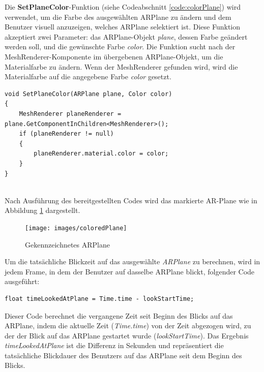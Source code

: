 Die \textbf{SetPlaneColor}-Funktion (siehe Codeabschnitt \ref{code:colorPlane}) wird verwendet, um die Farbe des ausgewählten
ARPlane zu ändern und dem Benutzer visuell anzuzeigen, welches ARPlane selektiert ist. Diese Funktion akzeptiert zwei
Parameter: das ARPlane-Objekt \textit{plane}, dessen Farbe geändert werden soll, und die gewünschte Farbe \textit{color}.
Die Funktion sucht nach der MeshRenderer-Komponente im übergebenen ARPlane-Objekt, um die Materialfarbe zu ändern. Wenn
der MeshRenderer gefunden wird, wird die Materialfarbe auf die angegebene Farbe \textit{color} gesetzt.
\begin{lstlisting}[style=csharp, caption={Ausgewaehltes ARPlane kennzeichnen}, label=code:colorPlane]
void SetPlaneColor(ARPlane plane, Color color)
{
    MeshRenderer planeRenderer = plane.GetComponentInChildren<MeshRenderer>();
    if (planeRenderer != null)
    {
        planeRenderer.material.color = color;
    }
}
\end{lstlisting}\\

Nach Ausführung des bereitgestellten Codes wird das markierte AR-Plane wie in Abbildung \ref{fig:colPlane} dargestellt.
\begin{figure}[h]
    \centering
    \texttt{[image: images/coloredPlane]}
    \caption{Gekennzeichnetes ARPlane}
    \label{fig:colPlane}
\end{figure}

Um die tatsächliche Blickzeit auf das ausgewählte \textit{ARPlane} zu berechnen, wird in jedem Frame, in dem der Benutzer
auf dasselbe ARPlane blickt, folgender Code ausgeführt:
\begin{lstlisting}[style=csharp, caption={Blickzeit messen}, label=code:TimeUpdate]
float timeLookedAtPlane = Time.time - lookStartTime;
\end{lstlisting}

Dieser Code berechnet die vergangene Zeit seit Beginn des Blicks auf das ARPlane, indem die aktuelle Zeit (\textit{Time.time})
von der Zeit abgezogen wird, zu der der Blick auf das ARPlane gestartet wurde (\textit{lookStartTime}). Das Ergebnis \textit{timeLookedAtPlane}
ist die Differenz in Sekunden und repräsentiert die tatsächliche Blickdauer des Benutzers auf das ARPlane seit dem Beginn des Blicks.\\

